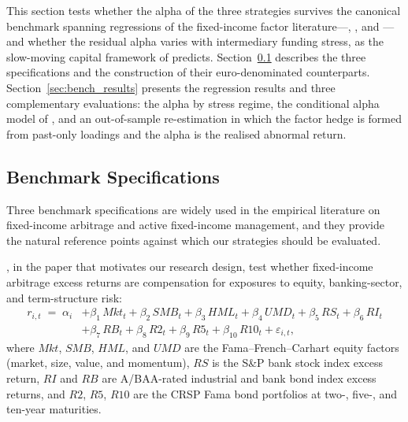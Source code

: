 


This section tests whether the alpha of the three strategies survives
the canonical benchmark spanning regressions of the fixed-income
factor literature---\citet{duarte2007risk}, \citet{fung2004hedge},
and \citet{brooks2020active}---and whether the residual alpha varies
with intermediary funding stress, as the slow-moving capital framework
of \citet{duffie2010presidential} predicts.
Section~\ref{sec:bench_specs} describes the three specifications and
the construction of their euro-denominated counterparts.
Section~\ref{sec:bench_results} presents the regression results and
three complementary evaluations: the alpha by stress regime, the
conditional alpha model of \citet{christopherson1998conditioning}, and
an out-of-sample re-estimation in which the factor hedge is formed
from past-only loadings and the alpha is the realised abnormal return.



\subsection{Benchmark Specifications}
\label{sec:bench_specs}

Three benchmark specifications are widely used in the empirical
literature on fixed-income arbitrage and active fixed-income
management, and they provide the natural reference points against
which our strategies should be evaluated.

\citet{duarte2007risk}, in the paper that motivates our research
design, test whether fixed-income arbitrage excess returns are
compensation for exposures to equity, banking-sector, and
term-structure risk:
\begin{equation}\label{eq:duarte}
\begin{split}
  r_{i,t} \;=\; \alpha_i
  &+ \beta_1\,\textit{Mkt}_t + \beta_2\,\textit{SMB}_t
   + \beta_3\,\textit{HML}_t + \beta_4\,\textit{UMD}_t + \beta_5\,\textit{RS}_t + \beta_6\,\textit{RI}_t\\
  &+ \beta_7\,\textit{RB}_t + \beta_8\,\textit{R2}_t + \beta_9\,\textit{R5}_t
   + \beta_{10}\,\textit{R10}_t + \varepsilon_{i,t},
\end{split}
\end{equation}
where $\textit{Mkt}$, $\textit{SMB}$, $\textit{HML}$, and
$\textit{UMD}$ are the Fama--French--Carhart equity factors (market,
size, value, and momentum), $\textit{RS}$ is the S\&P bank stock index
excess return, $\textit{RI}$ and $\textit{RB}$ are A/BAA-rated
industrial and bank bond index excess returns, and $\textit{R2}$,
$\textit{R5}$, $\textit{R10}$ are the CRSP Fama bond portfolios at
two-, five-, and ten-year maturities.


